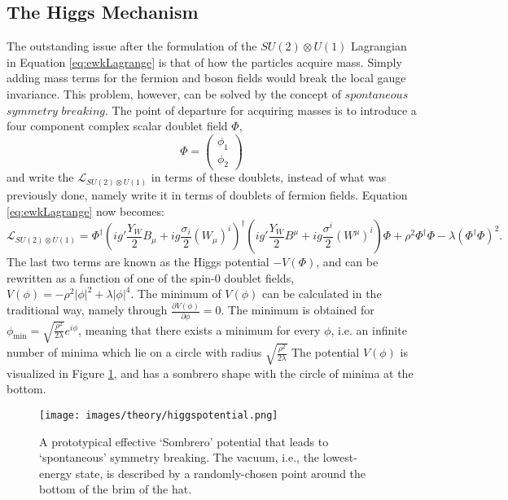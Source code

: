 \subsection*{The Higgs Mechanism}\label{sec:higgs}
\noindent\justify 
The outstanding issue after the formulation of the $SU(2)\otimes U(1)$ Lagrangian in Equation \ref{eq:ewkLagrange} is that of how the particles acquire mass. 
Simply adding mass terms for the fermion and boson fields would break the local gauge invariance. 
This problem, however, can be solved by the concept of $spontaneous$ $symmetry$ $breaking$. 
The point of departure for acquiring masses is to introduce a four component complex scalar doublet field $\Phi$,
\begin{equation}
\Phi=\begin{pmatrix} \phi_{1}\\ \phi_{2}\end{pmatrix}
\end{equation}
and write the $\mathcal{L}_{SU(2)\otimes U(1)}$ in terms of these doublets, instead of what was previously done, namely write it in terms of doublets of fermion fields.  
Equation \ref{eq:ewkLagrange} now becomes:
\begin{equation}
\mathcal{L}_{SU(2)\otimes U(1)}=
\Phi^{\dagger}\left( ig'\frac{Y_{W}}{2}B_{\mu}+ig\frac{\sigma_{i}}{2}(W_{\mu})^{i}\right)^{\dagger}\left(ig'\frac{Y_{W}}{2}B^{\mu}+ig\frac{\sigma^{i}}{2}(W^{\mu})^{i}\right)\Phi
+\rho^{2}\Phi^{\dagger}\Phi-\lambda(\Phi^{\dagger}\Phi)^{2}. 
\label{eq:higgsPotential}
\end{equation}
The last two terms are known as the Higgs potential $-V(\Phi)$, and can be rewritten as a function of one of the spin-0 doublet fields, $V(\phi)=-\rho^{2}|\phi|^{2}+\lambda|\phi|^{4}$. 
The minimum of $V(\phi)$ can be calculated in the traditional way, namely through $\frac{\partial V(\phi)}{\partial \phi}=0$. 
The minimum is obtained for $\phi_{\mathrm{min}}=\sqrt{\frac{\rho^{2}}{2\lambda}}e^{i\phi}$, meaning that there exists a minimum for every $\phi$, i.e. an infinite number of minima which lie on a circle with radius $\sqrt{\frac{\rho^{2}}{2\lambda}}$
The potential $V(\phi)$ is visualized in Figure \ref{fig:higgsPotential}, and has a sombrero shape with the circle of minima at the bottom.  
\begin{figure}[htbp!]
\begin{center}
    \texttt{[image: images/theory/higgspotential.png]}
    \caption{A prototypical effective `Sombrero' potential that leads to `spontaneous' symmetry breaking. 
The vacuum, i.e., the lowest-energy state, is described by a randomly-chosen point around the bottom of the brim of the hat. }
\label{fig:higgsPotential}
\end{center}
\end{figure}
